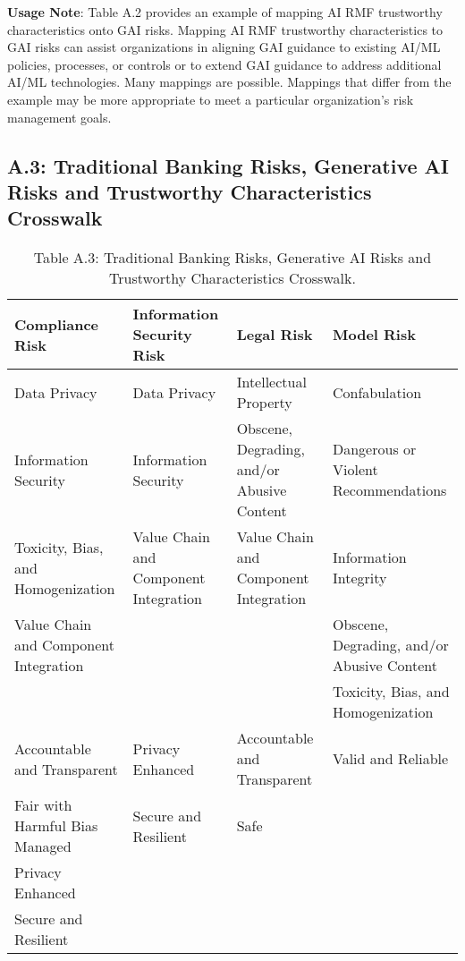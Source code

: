 \documentclass[fleqn]{article}
\begin{document}
\begin{landscape}
\noindent\textbf{Usage Note}: Table A.2 provides an example of mapping AI RMF trustworthy characteristics onto GAI risks. Mapping AI RMF trustworthy characteristics to GAI risks can assist organizations in aligning GAI guidance to existing AI/ML policies, processes, or controls or to extend GAI guidance to address additional AI/ML technologies. Many mappings are possible. Mappings that differ from the example may be more appropriate to meet a particular organization's risk management goals.

\vfill
\raisebox{-10pt}{\makebox[\linewidth]{\thepage}}
\end{landscape}

\begin{landscape}
\thispagestyle{empty}	
\subsection*{A.3: Traditional Banking Risks, Generative AI Risks and Trustworthy Characteristics Crosswalk}\label{sec:appndxa3}
\begin{table}[H]
	\caption*{Table A.3: Traditional Banking Risks, Generative AI Risks and Trustworthy Characteristics Crosswalk.}
	\label{tab:bankrisk_gai_risk_tc}
	\footnotesize
	\begin{tabular}{llll}
		\toprule
		\textbf{Compliance Risk} & \textbf{Information Security Risk} &  \textbf{Legal Risk} & \textbf{Model Risk} \\ 
		\midrule
		Data Privacy &  Data Privacy &  Intellectual Property & Confabulation \\
		Information Security &  Information Security & Obscene, Degrading, and/or Abusive Content & Dangerous or Violent Recommendations \\
		Toxicity, Bias, and Homogenization  & Value Chain and Component Integration & Value Chain and Component Integration & Information Integrity \\
		Value Chain and Component Integration & & & Obscene, Degrading, and/or Abusive Content \\
		& & & Toxicity, Bias, and Homogenization \\
		\midrule
		Accountable and Transparent & Privacy Enhanced & Accountable and Transparent & Valid and Reliable \\
		Fair with Harmful Bias Managed &  Secure and Resilient & Safe & \\
		Privacy Enhanced & & & \\
		Secure and Resilient & & & \\

\end{tabular}
\end{table}
\end{landscape}
\end{document}
